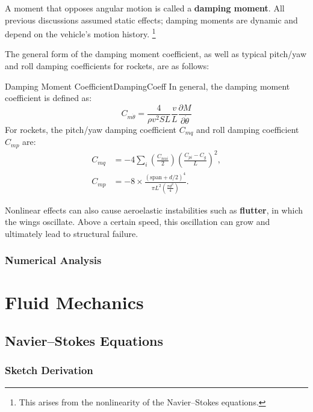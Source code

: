 \documentclass[uplatex,dvipdfmx,a4j,11pt]{report}
\newcommand{\keyword}[1]{\textcolor{mainblue}{\textbf{#1}}}
\numberwithin{equation}{chapter}
\begin{document}
\enskip

A moment that opposes angular motion is called a \keyword{damping moment}. All previous discussions assumed static effects; damping moments are dynamic and depend on the vehicle's motion history.
\footnote{This arises from the nonlinearity of the Navier--Stokes equations.}

The general form of the damping moment coefficient, as well as typical pitch/yaw and roll damping coefficients for rockets, are as follows:
\begin{definition}{Damping Moment Coefficient}{DampingCoeff}{}
  In general, the damping moment coefficient is defined as:
  \begin{equation}
  C_{m\dot{\theta}} = \frac{4}{\rho v^2 S L}\frac{v}{L}\frac{\partial M}{\partial\dot{\theta}} \label{fte_def}
  \end{equation}
  For rockets, the pitch/yaw damping coefficient $C_{mq}$ and roll damping coefficient $C_{mp}$ are:
  \begin{align}
    C_{mq} &= - 4 \sum_i \left(\frac{C_{n\alpha i}}{2}\right)\left(\frac{C_{pi} - C_{g}}{L}\right)^2,\\
    C_{mp} &= - 8 \times \frac{\left(\mathrm{span} + d/2\right)^4}{\pi L^2 \left(\frac{\pi d^2}{4}\right)}.
  \end{align}
\end{definition}

\enskip

Nonlinear effects can also cause aeroelastic instabilities such as \keyword{flutter}, in which the wings oscillate. Above a certain speed, this oscillation can grow and ultimately lead to structural failure.

\subsection{Numerical Analysis}

\chapter{Fluid Mechanics}

\section{Navier--Stokes Equations}
\subsection{Sketch Derivation}
\end{document}
